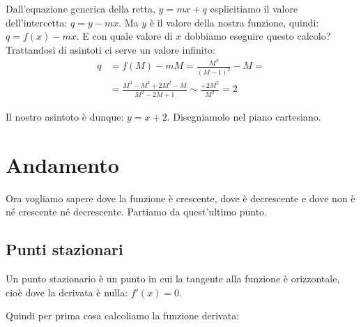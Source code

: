\begin{minipage}{.60\linewidth}
Dall'equazione generica della retta, \(y=mx+q\) esplicitiamo il valore 
dell'intercetta: \(q=y-mx\). 
Ma \(y\) è il valore della nostra funzione, quindi: \(q=f(x)-mx\). 
E con quale valore di \(x\) dobbiamo eseguire questo calcolo? 
Trattandosi di asintoti ci serve un valore infinito:
\begin{align*}
 q &= f(M)-mM = \frac{M^3}{(M-1)^2}-M =\\
   &= \frac{M^3-M^3 +2M^2 -M}{M^2 -2M +1} \sim \frac{+2M^2}{M^2} = 2
\end{align*}

Il nostro asintoto è dunque: \(y=x+2\).
Disegniamolo nel piano cartesiano.
\end{minipage}
\hfill
\begin{minipage}{.38\linewidth}
 \begin{center}
\asintotifunzionea
 \end{center}
\end{minipage}

\section{Andamento}
\label{sec:03_andamento}

Ora vogliamo sapere dove la funzione è crescente, dove è decrescente e dove 
non è né crescente né decrescente. Partiamo da quest'ultimo punto.

\subsection{Punti stazionari}

Un punto stazionario è un punto in cui la tangente alla funzione è 
orizzontale, cioè dove la derivata è nulla: \(f'(x)=0\).

Quindi per prima cosa calcoliamo la funzione derivata:


